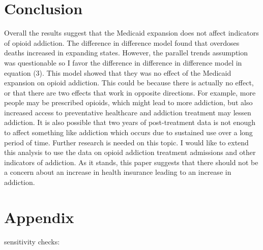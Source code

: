 \documentclass[11pt]{article}
\begin{document}
\cleardoublepage




\section{Conclusion}

Overall the results suggest that the Medicaid expansion does not affect indicators of opioid addiction.  The difference in difference model found that overdoses deaths increased in expanding states.  However, the parallel trends assumption was questionable so I favor the difference in difference in difference model in equation (3).  This model showed that they was no effect of the Medicaid expansion on opioid addiction.  This could be because there is actually no effect, or that there are two effects that work in opposite directions.  For example, more people may be prescribed opioids, which might lead to more addiction, but also increased access to preventative healthcare and addiction treatment may lessen addiction.  It is also possible that two years of post-treatment data is not enough to affect something like addiction which occurs due to sustained use over a long period of time.  Further research is needed on this topic.  I would like to extend this analysis to use the data on opioid addiction treatment admissions and other indicators of addiction.  As it stands, this paper suggests that there should not be a concern about an increase in health insurance leading to an increase in addiction. 





\section{Appendix}




sensitivity checks:
\end{document}
